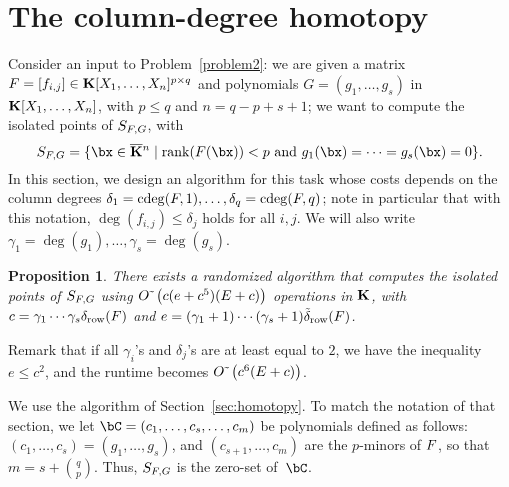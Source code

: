 \documentclass[12pt]{article}
\newtheorem{proposition}[definition]{Proposition}
\begin{document}
\section{The column-degree homotopy}

Consider an input to Problem~\ref{problem2}: we are given a matrix
${F} =[f_{i,j}]\in \mathbf{K}[X_1,\dots,X_n]^{p \times q}$ and polynomials
$G=(g_1,\dots,g_s)$ in $\mathbf{K}[X_1,\dots,X_n]$, with $p \leq q$ and $n =
q-p+s+1$; we want to compute the isolated points of $S_{{F},G}$,
with
$$S_{\mF,G} = \{\bx \in \KKbar{}^n \mid  \mathrm{rank}(\mF({\bx})) < p
\text{~and~} g_1(\bx)=\cdots=g_s(\bx)=0\}.$$ In this section, we
design an algorithm for this task whose costs depends on the column
degrees $\delta_1=\mathrm{cdeg}({F},1),\dots,\delta_q=\mathrm{cdeg}({F},q)$; note in particular
that with this notation, $\deg(f_{i,j}) \leq \delta_j$ holds for all $i,j$.
We will also write $\gamma_1=\deg(g_1),\dots,\gamma_s=\deg(g_s)$.

\begin{proposition}
  There exists a randomized algorithm that computes the isolated
  points of $S_{{F},G}$ using ${O}{\,\tilde{ }\,}\left (c(e+c^5 )(E + c)\right)$
  operations in $\mathbf{K}$, with $c=\gamma_1\cdots\gamma_s \delta_{\rm
    row}({F})$ and $e=(\gamma_1+1)\cdots(\gamma_s+1) \tilde\delta_{\rm
    row}({F})$.
\end{proposition}
Remark that if all $\gamma_i$'s and $\delta_j$'s are at least equal to
$2$, we have the inequality $e \le c^2$, and the runtime becomes
${O}{\,\tilde{ }\,}\left (c^6 (E + c)\right)$.

\medskip

We use the algorithm of Section~\ref{sec:homotopy}. To match the
notation of that section, we let $\bC=(c_1,\dots,c_{s},\dots,c_m)$ be
polynomials defined as follows: $(c_1,\dots,c_{s})=(g_1,\dots,g_s)$,
and $(c_{s+1},\dots,c_{m})$ are the $p$-minors of ${F}$, so that 
$m=s+{q \choose p}$. Thus, $S_{{F},G}$ is the zero-set of~$\bC$.
\end{document}
